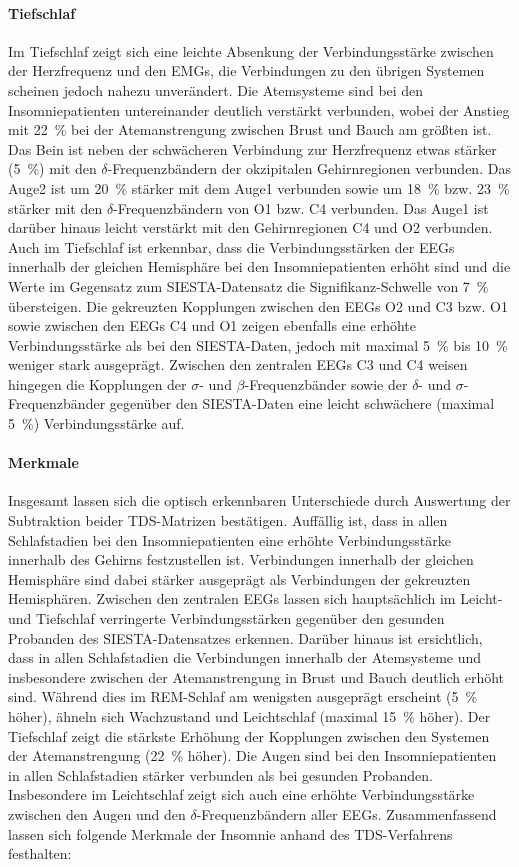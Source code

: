 \paragraph{Tiefschlaf} Im Tiefschlaf zeigt sich eine leichte Absenkung der Verbindungsstärke zwischen der Herzfrequenz und den \acs{EMG}s, die Verbindungen zu den übrigen Systemen scheinen jedoch nahezu unverändert. Die Atemsysteme sind bei den Insomniepatienten untereinander deutlich verstärkt verbunden, wobei der Anstieg mit 22~\% bei der Atemanstrengung zwischen Brust und Bauch am größten ist. Das Bein ist neben der schwächeren Verbindung zur Herzfrequenz etwas stärker (5~\%) mit den $\delta$-Frequenzbändern der okzipitalen Gehirnregionen verbunden. Das Auge2 ist um 20~\% stärker mit dem Auge1 verbunden sowie um 18~\% bzw. 23~\% stärker mit den $\delta$-Frequenzbändern von O1 bzw. C4 verbunden. Das Auge1 ist darüber hinaus leicht verstärkt mit den Gehirnregionen C4 und O2 verbunden. Auch im Tiefschlaf ist erkennbar, dass die Verbindungsstärken der \acs{EEG}s innerhalb der gleichen Hemisphäre bei den Insomniepatienten erhöht sind und die Werte im Gegensatz zum SIESTA-Datensatz die Signifikanz-Schwelle von 7~\% übersteigen. Die gekreuzten Kopplungen zwischen den \acs{EEG}s O2 und C3 bzw. O1 sowie zwischen den \acs{EEG}s C4 und O1 zeigen ebenfalls eine erhöhte Verbindungsstärke als bei den SIESTA-Daten, jedoch mit maximal 5~\% bis 10~\% weniger stark ausgeprägt. Zwischen den zentralen \acs{EEG}s C3 und C4 weisen hingegen die Kopplungen der $\sigma$- und $\beta$-Frequenzbänder sowie der $\delta$- und $\sigma$-Frequenzbänder gegenüber den SIESTA-Daten eine leicht schwächere (maximal 5~\%) Verbindungsstärke auf.

\paragraph{Merkmale} Insgesamt lassen sich die optisch erkennbaren Unterschiede durch Auswertung der Subtraktion beider \acs{TDS}-Matrizen bestätigen. Auffällig ist, dass in allen Schlafstadien bei den Insomniepatienten eine erhöhte Verbindungsstärke innerhalb des Gehirns festzustellen ist. Verbindungen innerhalb der gleichen Hemisphäre sind dabei stärker ausgeprägt als Verbindungen der gekreuzten Hemisphären. Zwischen den zentralen \acs{EEG}s lassen sich hauptsächlich im Leicht- und Tiefschlaf verringerte Verbindungsstärken gegenüber den gesunden Probanden des SIESTA-Datensatzes erkennen. Darüber hinaus ist ersichtlich, dass in allen Schlafstadien die Verbindungen innerhalb der Atemsysteme und insbesondere zwischen der Atemanstrengung in Brust und Bauch deutlich erhöht sind. Während dies im \acs{REM}-Schlaf am wenigsten ausgeprägt erscheint (5~\% höher), ähneln sich Wachzustand und Leichtschlaf (maximal 15~\% höher). Der Tiefschlaf zeigt die stärkste Erhöhung der Kopplungen zwischen den Systemen der Atemanstrengung (22~\% höher). Die Augen sind bei den Insomniepatienten in allen Schlafstadien stärker verbunden als bei gesunden Probanden. Insbesondere im Leichtschlaf zeigt sich auch eine erhöhte Verbindungsstärke zwischen den Augen und den $\delta$-Frequenzbändern aller \acs{EEG}s. Zusammenfassend lassen sich folgende Merkmale der Insomnie anhand des \acs{TDS}-Verfahrens festhalten:

